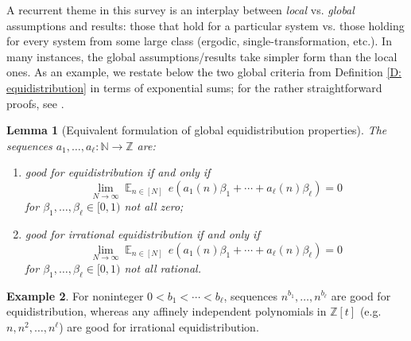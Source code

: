 \documentclass[11pt]{amsart}
\newtheorem{lemma}{Lemma}[section]
\theoremstyle{definition}
\newtheorem{example}[lemma]{Example}
\DeclareMathOperator*{\E}{\mathbb{E}}
\newcommand{\N}{{\mathbb N}}
\newcommand{\Z}{{\mathbb Z}}
\newcommand{\1}{{\mathbf{1}}}
\begin{document}
A recurrent theme in this survey is an interplay between \emph{local} vs. \emph{global} assumptions and results: those that hold for a particular system vs. those holding for every system from some large class (ergodic, single-transformation, etc.). In many instances, the global assumptions/results take simpler form than the local ones. As an example, we restate below the two global criteria from Definition \ref{D: equidistribution} in terms of exponential sums; for the rather straightforward proofs, see \cite[Lemma 2.4]{FrKu22a}.
\begin{lemma}[Equivalent formulation of global equidistribution properties]
    The sequences $a_1,\ldots,a_\ell\colon \N\to \Z$ are:
    \begin{enumerate}
        \item good for equidistribution if and only if 
    $$
		\lim_{N\to\infty} \E_{n\in [N]}\, e(a_1(n)\beta_1+\cdots+a_\ell(n)\beta_\ell)=0
	$$
		for   $\beta_1,\ldots, \beta_\ell\in [0,1)$ not all zero;
        \item good for irrational equidistribution if and only if 
    $$
		\lim_{N\to\infty} \E_{n\in [N]}\, e(a_1(n)\beta_1+\cdots+a_\ell(n)\beta_\ell)=0
	$$
		for  $\beta_1,\ldots, \beta_\ell\in [0,1)$ not all rational.
    \end{enumerate}
\end{lemma}
\begin{example}
    For noninteger $0<b_1<\cdots < b_\ell$, sequences $n^{b_1}, \ldots, n^{b_\ell}$ are good for equidistribution, whereas any affinely independent polynomials in $\Z[t]$ (e.g. $n, n^2, \ldots, n^\ell$) are good for irrational equidistribution.
\end{example}
\end{document}
